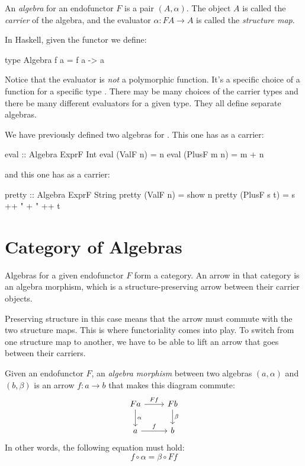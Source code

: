\documentclass[DaoFP]{subfiles}
\begin{document}
An \emph{algebra} for an endofunctor $F$ is a pair $(A, \alpha)$. The object $A$ is called the \emph{carrier} of the algebra, and the evaluator $\alpha \colon F A \to A$ is called the \emph{structure map}.

In Haskell, given the functor  we define:
\begin{haskell}
type Algebra f a = f a -> a
\end{haskell}

Notice that the evaluator is \emph{not} a polymorphic function. It's a specific choice of a function for a specific type . There may be many choices of the carrier types and there be many different evaluators for a given type. They all define separate algebras.

We have previously defined two algebras for . This one has  as a carrier:
\begin{haskell}
eval :: Algebra ExprF Int
eval (ValF n)   = n
eval (PlusF m n) = m + n
\end{haskell}
and this one has  as a carrier:
\begin{haskell}
pretty :: Algebra ExprF String
pretty (ValF n)   = show n
pretty (PlusF s t) = s ++ " + " ++ t
\end{haskell}

\section{Category of Algebras}

Algebras for a given endofunctor $F$ form a category. An arrow in that category is an algebra morphism, which is a structure-preserving arrow between their carrier objects. 

Preserving structure in this case means that the arrow must commute with the two structure maps. This is where functoriality comes into play. To switch from one structure map to another, we have to be able to lift an arrow that goes between their carriers. 

Given an endofunctor $F$, an \emph{algebra morphism} between two algebras $(a, \alpha)$ and $(b, \beta)$ is an arrow $f \colon a \to b$ that makes this diagram commute:
\[
 \begin{tikzcd}
 F a 
 \arrow[r, "F f"]
 \arrow[d, "\alpha"]
 & F b
\arrow[d, "\beta"]
 \\
 a
 \arrow[r, "f"]
 & b
  \end{tikzcd}
\]
In other words, the following equation must hold:
\[f \circ \alpha = \beta \circ F f \]
\end{document}
